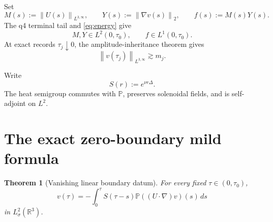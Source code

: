 \documentclass[11pt]{article}
\newtheorem{theorem}{Theorem}
\theoremstyle{remark}
\newcommand{\R}{\mathbb R}
\newcommand{\Pp}{\mathbb P}
\newcommand{\norm}[1]{\left\|#1\right\|}
\begin{document}
Set
\begin{equation}
\label{eq:MY}
 M(s):=\norm{U(s)}_{L^{3,\infty}},
 \qquad
 Y(s):=\norm{\nabla v(s)}_2,
 \qquad
 f(s):=M(s)Y(s).
\end{equation}
The q4 terminal tail and \eqref{eq:energy} give
\begin{equation}
\label{eq:L2-factors}
 M,Y\in L^2(0,\tau_0),
 \qquad
 f\in L^1(0,\tau_0).
\end{equation}
At exact records \(\tau_j\downarrow0\), the amplitude-inheritance theorem
gives
\begin{equation}
\label{eq:record-amplitude}
 \norm{v(\tau_j)}_{L^{3,\infty}}\gtrsim m_j.
\end{equation}

Write
\begin{equation}
\label{eq:heat}
 S(r):=e^{\nu r\Delta}.
\end{equation}
The heat semigroup commutes with \(\Pp\), preserves solenoidal fields,
and is self-adjoint on \(L^2\).

\section{The exact zero-boundary mild formula}

\begin{theorem}[Vanishing linear boundary datum]
\label{thm:mild}
For every fixed \(\tau\in(0,\tau_0)\),
\begin{equation}
\label{eq:mild}
 \boxed{
 v(\tau)
 =
 -\int_0^\tau
 S(\tau-s)\Pp((U\cdot\nabla)v)(s)\,ds
 }
\end{equation}
in \(L^2_\sigma(\R^3)\).
\end{theorem}
\end{document}
